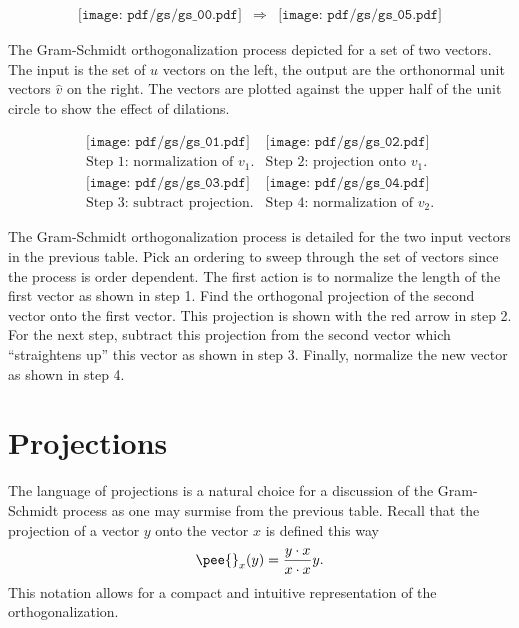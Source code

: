 \begin{table}[htdp]
$$
\boxed{
\begin{array}{ccc}
\texttt{[image: pdf/gs/gs\_00.pdf]} &
\Rightarrow &
\texttt{[image: pdf/gs/gs\_05.pdf]}
\end{array}
}
$$
\label{tab:gs:io}
\caption[The Gram-Schmidt orthogonalization process]{The Gram-Schmidt orthogonalization process depicted for a set of two vectors. The input is the set of $u$ vectors on the left, the output are the orthonormal unit vectors $\hat{v}$ on the right. The vectors are plotted against the upper half of the unit circle to show the effect of dilations.}
\end{table}
\begin{table}[top]
$$
\boxed{
\begin{array}{cc}
\texttt{[image: pdf/gs/gs\_01.pdf]} &
\texttt{[image: pdf/gs/gs\_02.pdf]} \\
\text{Step 1: normalization of $v_{1}$.} &
\text{Step 2: projection onto $v_{1}$.} \\[10pt]\hline
\texttt{[image: pdf/gs/gs\_03.pdf]} &
\texttt{[image: pdf/gs/gs\_04.pdf]} \\
\text{Step 3: subtract projection.} &
\text{Step 4: normalization of $v_{2}$.}
\end{array}
}
$$
\label{tab:gs:guts}
\caption[The Gram-Schmidt orthogonalization process for two vectors]{The Gram-Schmidt orthogonalization process is detailed for the two input vectors in the previous table. Pick an ordering to sweep through the set of vectors since the process is order dependent. The first action is to normalize the length of the first vector as shown in step 1. Find the orthogonal projection of the second vector onto the first vector. This projection is shown with the red arrow in step 2. For the next step, subtract this projection from the second vector which ``straightens up'' this vector as shown in step 3. Finally, normalize the new vector as shown in step 4.}
\end{table}

\section{Projections}
The language of projections is a natural choice for a discussion of the Gram-Schmidt process as one may surmise from the previous table. Recall that the projection of a vector $y$ onto the vector $x$ is defined this way
\begin{equation}
  \pee{}_{x}(y) = \frac{y\cdot x}{x\cdot x}y.
\end{equation}
This notation allows for a compact and intuitive representation of the orthogonalization.

